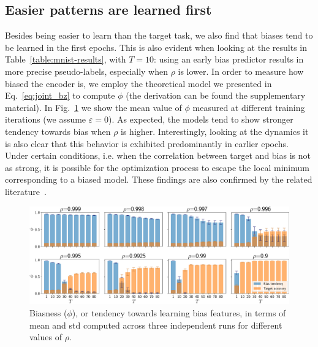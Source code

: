 \subsection{Easier patterns are learned first}
\label{sec:easy_first}
Besides being easier to learn than the target task, we also find that biases tend to be learned in the first epochs. This is also evident when looking at the results in Table~\ref{table:mnist-results}, with $T=10$: using an early bias predictor results in more precise pseudo-labels, especially when $\rho$ is lower. In order to measure how biased the encoder is, we employ the theoretical model we presented in Eq.~\eqref{eq:joint_bz} to compute $\phi$ (the derivation can be found the supplementary material). %
In Fig.~\ref{fig:bias-tendency} we show the mean value of $\phi$ measured at different training iterations (we assume $\varepsilon=0$). As expected, the models tend to show stronger tendency towards bias when $\rho$ is higher. Interestingly, looking at the dynamics it is also clear that this behavior is exhibited predominantly in earlier epochs.
Under certain conditions, i.e. when the correlation between target and bias is not as strong, it is possible for the optimization process to escape the local minimum corresponding to a biased model. These findings are also confirmed by the related literature~\cite{nam2020learning, arpit2017memorization}. 

\begin{figure}
    \centering
    \includegraphics[width=\textwidth]{img/v.pdf}
    \caption{Biasness ($\phi$), or tendency towards learning bias features, in terms of mean and std computed across three independent runs for different values of $\rho$.}
    \label{fig:bias-tendency}
\end{figure}


